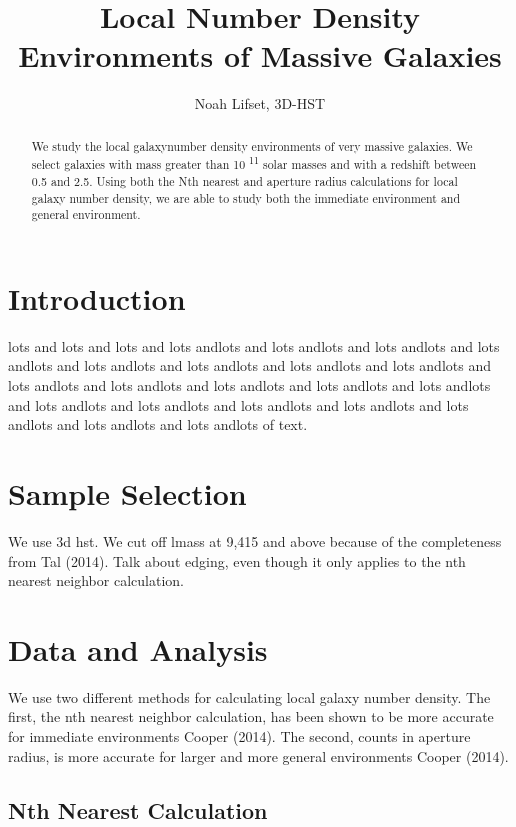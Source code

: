 \documentclass[apj]{emulateapj}
\begin{document}
 
\title{Local Number Density Environments of Massive Galaxies}

\author{Noah Lifset, 3D-HST}

\begin{abstract}

We study the local galaxynumber density environments of very massive galaxies. We select galaxies with mass greater than 10 \textsuperscript{11} solar masses and with a redshift between 0.5 and 2.5. Using both the Nth nearest and aperture radius calculations for local galaxy number density, we are able to study both the immediate environment and general environment. \citet{TOMER}
\end{abstract}

\section{Introduction}

lots and lots and lots and lots andlots and lots andlots and lots andlots and lots andlots and lots andlots and lots andlots and lots andlots and lots andlots and lots andlots and lots andlots and lots andlots and lots andlots and lots andlots and lots andlots and lots andlots and lots andlots and lots andlots and lots andlots and lots andlots and lots andlots of text.

\section{Sample Selection}

We use 3d hst. We cut off lmass at 9,415 and above because of the completeness from Tal (2014). Talk about edging, even though it only applies to the nth nearest neighbor calculation. 

\section{Data and Analysis}

We use two different methods for calculating local galaxy number density. The first, the nth nearest neighbor calculation, has been shown to be more accurate for immediate environments Cooper (2014). The second, counts in aperture radius, is more accurate for larger and more general environments Cooper (2014).

\subsection{Nth Nearest Calculation}
\end{document}
